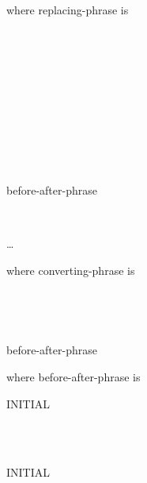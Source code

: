 where replacing-phrase is

\begin{1=}
  \begin{1=}
     \\

    \begin{0-1}
       \\
       \\
       \\
    \end{0-1}
    \begin{1=}
      \identifier \\
      \literal
    \end{1=}
  \end{1=}
  \begin{1=}
    \identifier \\
    \literal \\
  \end{1=}
  \begin{0-1}
    before-after-phrase
  \end{0-1} \\
\end{1=} \ldots

where converting-phrase is

\begin{1=}
  \identifier \\
  \literal
\end{1=}
\begin{1=}
  \identifier \\
  \literal
\end{1=}
\begin{0-1}
  before-after-phrase
\end{0-1}

where before-after-phrase is

\begin{0+}
   INITIAL
  \begin{1=}
    \identifier \\
    \literal
  \end{1=} \\

   INITIAL
  \begin{1=}
    \identifier \\
    \literal
  \end{1=}
\end{0+}

